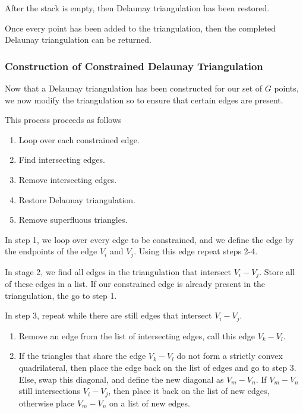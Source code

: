 \documentclass[../fem.tex]{subfile}
\begin{document}
After the stack is empty, then Delaunay triangulation has been restored.

Once every point has been added to the triangulation, then the completed
Delaunay triangulation can be returned.

\subsubsection{Construction of Constrained Delaunay Triangulation}%
\label{ssub:construction_of_constrained_delaunay_triangulation}

Now that a Delaunay triangulation has been constructed for our set of $G$
points, we now modify the triangulation so to ensure that certain edges are
present.

This process proceeds as follows

\begin{enumerate}[label=\arabic*.]
  \item Loop over each constrained edge.
  \item Find intersecting edges.
  \item Remove intersecting edges.
  \item Restore Delaunay triangulation.
  \item Remove superfluous triangles.
\end{enumerate}

In step 1, we loop over every edge to be constrained, and we define the edge by
the endpoints of the edge $V_i$ and $V_j$. Using this edge repeat steps 2-4.

In stage 2, we find all edges in the triangulation that intersect $V_i-V_j$.
Store all of these edges in a list. If our constrained edge is already present
in the triangulation, the go to step 1.

In step 3, repeat while there are still edges that intersect $V_i-V_j$.
\begin{enumerate}[label=3.\arabic*.]
  \item Remove an edge from the list of intersecting edges, call this edge
    $V_k-V_l$.
  \item If the triangles that share the edge $V_k-V_l$ do not form a strictly
    convex quadrilateral, then place the edge back on the list of edges and go
    to step 3. Else, swap this diagonal, and define the new diagonal as
    $V_m-V_n$. If $V_m-V_n$ still intersections $V_i-V_j$, then place it back
    on the list of new edges, otherwise place $V_m-V_n$ on a list of new edges.
\end{enumerate}
\end{document}
